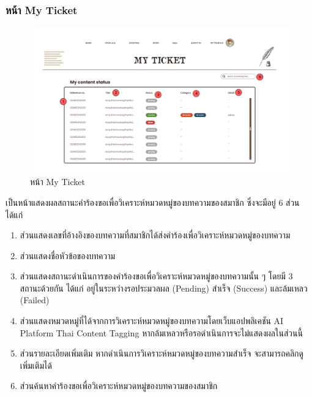 \documentclass[12pt,oneside,openright,a4paper]{cpe-thai-project}
\begin{document}
\subsubsection{หน้า My Ticket}
\begin{figure}[!ht]\centering
  \includegraphics[width=16cm]{./img/project_ui/ticket.png} 
  \caption{หน้า My Ticket}\label{fig:ticket_page} 
\end{figure}
\hspace*{1cm}เป็นหน้าแสดงผลสถานะคำร้องขอเพื่อวิเคราะห์หมวดหมู่ของบทความของสมาชิก ซึ่งจะมีอยู่ 6 ส่วน ได้แก่
\begin{enumerate}
  \item ส่วนแสดงเลขที่อ้างอิงของบทความที่สมาชิกได้ส่งคำร้องเพื่อวิเคราะห์หมวดหมู่ของบทความ
  \item ส่วนแสดงชื่อหัวข้อของบทความ
  \item ส่วนแสดงสถานะดำเนินการของคำร้องขอเพื่อวิเคราะห์หมวดหมู่ของบทความนั้น ๆ โดยมี 3 สถานะด้วยกัน 
        ได้แก่ อยู่ในระหว่างรอประมวลผล (Pending) สำเร็จ (Success) และล้มเหลว (Failed)
  \item ส่วนแสดงหมวดหมู่ที่ได้จากการวิเคราะห์หมวดหมู่ของบทความโดยเว็บแอปพลิเคชัน AI Platform Thai Content Tagging 
        หากล้มเหลวหรือรอดำเนินการจะไม่แสดงผลในส่วนนี้
  \item ส่วนรายละเอียดเพิ่มเติม หากดำเนินการวิเคราะห์หมวดหมู่ของบทความสำเร็จ จะสามารถคลิกดูเพิ่มเติมได้
  \item ส่วนค้นหาคำร้องขอเพื่อวิเคราะห์หมวดหมู่ของบทความของสมาชิก
\end{enumerate} \newpage
\end{document}
